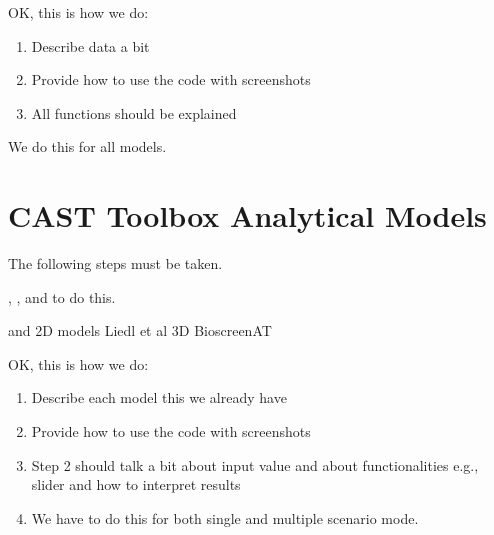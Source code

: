 \documentclass[letterpaper,10pt,english]{sphinxmanual}
\begin{document}
\sphinxAtStartPar
OK, this is how we do:
\begin{enumerate}
%
\item {} 
\sphinxAtStartPar
Describe data a bit

\item {} 
\sphinxAtStartPar
Provide how to use the code with screenshots

\item {} 
\sphinxAtStartPar
All functions should be explained

\end{enumerate}

\sphinxAtStartPar
We do this for all models.


\chapter{CAST Toolbox \sphinxhyphen{} Analytical Models}
\label{\detokenize{contents/toolbox/an_model/an_model:cast-toolbox-analytical-models}}\label{\detokenize{contents/toolbox/an_model/an_model::doc}}
\sphinxAtStartPar
The following steps must be taken.

\sphinxAtStartPar
{}, ,  and  to do this.

\sphinxAtStartPar
{} and  \sphinxhyphen{} 2D models
 Liedl et al 3D
 Bioscreen\sphinxhyphen{}AT

\sphinxAtStartPar
OK, this is how we do:
\begin{enumerate}
%
\item {} 
\sphinxAtStartPar
Describe each model \sphinxhyphen{} this we already have

\item {} 
\sphinxAtStartPar
Provide how to use the code with screenshots

\item {} 
\sphinxAtStartPar
Step 2 should talk a bit about input value and about functionalities \sphinxhyphen{} e.g., slider and how to interpret results

\item {} 
\sphinxAtStartPar
We have to do this for both single and multiple scenario mode.

\end{enumerate}
\end{document}
